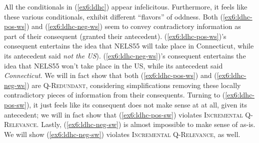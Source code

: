 \begin{exe}
	\ex\label{ex6:ldhc}
	\begin{xlist}
		\label{ex6:ldhc-pos-ws}
		\label{ex6:ldhc-pos-sw}
		\label{ex6:ldhc-neg-ws}
		\label{ex6:ldhc-neg-sw}	
	\end{xlist}
\end{exe}

All the conditionals in (\ref{ex6:ldhc}) appear infelicitous. Furthermore, it feels like these various conditionals, exhibit different ``flavors'' of oddness. Both (\ref{ex6:ldhc-pos-ws}) and (\ref{ex6:ldhc-neg-ws}) seem to convey contradictory information as part of their consequent (granted their antecedent). (\ref{ex6:ldhc-pos-ws})'s consequent entertains the idea that NELS55 will take place in Connecticut, while its antecedent said \textit{not the US}). (\ref{ex6:ldhc-neg-ws})'s consequent entertains the idea that NELS55 won't take place in the US, while its antecedent said \textit{Connecticut}. We will in fact show that both (\ref{ex6:ldhc-pos-ws}) and (\ref{ex6:ldhc-neg-ws}) are \textsc{Q-Redundant}, considering simplifications removing these locally contradictory pieces of information from their consequents.
Turning to (\ref{ex6:ldhc-pos-sw}), it just feels like its consequent does not make sense at at all, given its antecedent; we will in fact show that (\ref{ex6:ldhc-pos-sw}) violates \textsc{Incremental Q-Relevance}. Lastly, (\ref{ex6:ldhc-neg-sw}) is almost impossible to make sense of as-is. We will show (\ref{ex6:ldhc-neg-sw}) violates \textsc{Incremental Q-Relevance}, as well.\\

